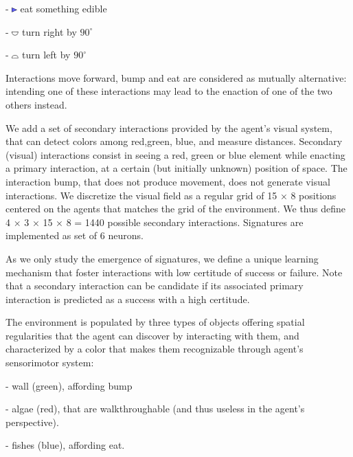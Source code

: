\documentclass[conference]{IEEEtran}
\begin{document}
- \includegraphics[width=0.015\textwidth]{img/mf2.pdf} eat something edible 

- \includegraphics[width=0.02\textwidth]{img/rt0.pdf} turn right by $90^\circ$ 

- \includegraphics[width=0.02\textwidth]{img/lt0.pdf} turn left by $90^\circ$ 

Interactions move forward, bump and eat are considered as mutually alternative: intending one of these interactions may lead to the enaction of one of the two others instead. %

We add a set of secondary interactions provided by the agent’s visual system, that can detect colors among {red,green, blue}, and measure distances.  Secondary (visual) interactions consist in seeing a red, green or blue element while enacting a primary interaction, at a certain (but initially unknown) position of space. The interaction bump, that does not produce movement, does not generate visual interactions. We discretize the visual field as a regular grid of 15 × 8 positions centered on the agents that matches the grid of the environment. We thus define 4 × 3 × 15 × 8 = 1440 possible secondary interactions.
Signatures are implemented as set of 6 neurons. %

As we only study the emergence of signatures, we define a unique learning mechanism that foster interactions with low certitude of success or failure. Note that a secondary interaction can be candidate if its associated primary interaction is predicted as a success with a high certitude.

The environment is populated by three types of objects offering spatial regularities that the agent can discover by interacting with them, and characterized by a color that makes them recognizable through agent's sensorimotor system:

- wall (green), affording bump

- algae (red), that are walkthroughable (and thus useless in the agent's perspective).

- fishes (blue), affording eat.
\end{document}
